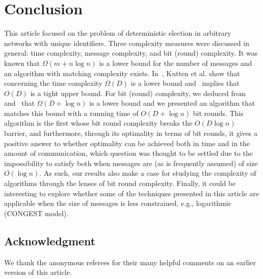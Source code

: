 \documentclass[11pt,envcountsame,letterpaper]{llncs}
\begin{document}
\section{Conclusion}
\label{sec:conclusion}
This article focused on the problem of deterministic election in arbitrary networks with unique identifiers. Three complexity measures were discussed in general: time complexity, message complexity, and bit (round) complexity.
It was known that $\Omega(m+n\log n)$ is a lower bound for the number of messages and an algorithm with matching complexity exists.
In~\cite{KPPRT15}, Kutten et al. show that concerning the time
complexity $\Omega(D)$ is a lower bound and~\cite{Peleg90} implies that
$O(D)$ is a tight upper bound. 
For bit (round) complexity, we deduced from~\cite{KPPRT15} and~\cite{DS07}
that  $\Omega(D+\log n)$ is a lower bound and we presented 
an algorithm that matches this bound with a running time of $O(D+\log n)$ bit rounds. This algorithm is the first whose bit round complexity breaks the $O(D \log n)$ barrier, and furthermore, through its optimality in terms of bit rounds, it gives a positive answer to whether optimality can be
achieved
both in time and in the amount of communication, which question was thought to be settled due to the impossibility to satisfy both when messages are (as is frequently assumed) of size $O(\log n)$. As such, our results also make a case for studying the complexity of algorithms through the lenses of bit round complexity. Finally, it could be interesting to explore whether some of the techniques presented in this article are applicable when the size of messages is less constrained, e.g., logarithmic (CONGEST model).

\subsection*{Acknowledgment} We thank the anonymous referees for their many helpful comments on an earlier version of this article.



\end{document}
